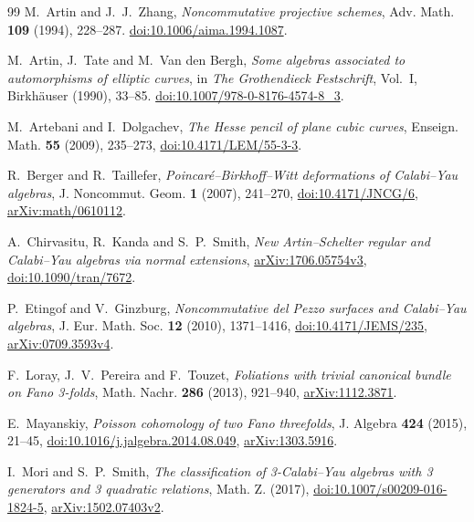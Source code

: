 \documentclass[11pt,a4paper]{ltjsarticle}
\numberwithin{equation}{section}
\begin{document}
\begin{thebibliography}{99}
M.~Artin and J.~J.~Zhang,
\textit{Noncommutative projective schemes},
Adv. Math. \textbf{109} (1994), 228--287.
\href{https://doi.org/10.1006/aima.1994.1087}{doi:10.1006/aima.1994.1087}.

M.~Artin, J.~Tate and M.~Van den Bergh,
\textit{Some algebras associated to automorphisms of elliptic curves},
in \textit{The Grothendieck Festschrift}, Vol.~I,
Birkh\"auser (1990), 33--85.
\href{https://doi.org/10.1007/978-0-8176-4574-8_3}{doi:10.1007/978-0-8176-4574-8\_3}.

M.~Artebani and I.~Dolgachev,
\textit{The Hesse pencil of plane cubic curves},
Enseign. Math. \textbf{55} (2009), 235--273,
\href{https://doi.org/10.4171/LEM/55-3-3}{doi:10.4171/LEM/55-3-3}.

R.~Berger and R.~Taillefer,
\textit{Poincar\'e--Birkhoff--Witt deformations of Calabi--Yau algebras},
J. Noncommut. Geom. \textbf{1} (2007), 241--270,
\href{https://doi.org/10.4171/JNCG/6}{doi:10.4171/JNCG/6},
\href{https://arxiv.org/abs/math/0610112}{arXiv:math/0610112}.

A.~Chirvasitu, R.~Kanda and S.~P.~Smith,
\textit{New Artin--Schelter regular and Calabi--Yau algebras via normal extensions},
\href{https://arxiv.org/abs/1706.05754}{arXiv:1706.05754v3},
\href{https://doi.org/10.1090/tran/7672}{doi:10.1090/tran/7672}.

P.~Etingof and V.~Ginzburg,
\textit{Noncommutative del Pezzo surfaces and Calabi--Yau algebras},
J. Eur. Math. Soc. \textbf{12} (2010), 1371--1416,
\href{https://doi.org/10.4171/JEMS/235}{doi:10.4171/JEMS/235},
\href{https://arxiv.org/abs/0709.3593}{arXiv:0709.3593v4}.

F.~Loray, J.~V.~Pereira and F.~Touzet,
\textit{Foliations with trivial canonical bundle on Fano 3-folds},
Math. Nachr. \textbf{286} (2013), 921--940,
\href{https://arxiv.org/abs/1112.3871}{arXiv:1112.3871}.

E.~Mayanskiy,
\textit{Poisson cohomology of two Fano threefolds},
J. Algebra \textbf{424} (2015), 21--45,
\href{https://doi.org/10.1016/j.jalgebra.2014.08.049}{doi:10.1016/j.jalgebra.2014.08.049},
\href{https://arxiv.org/abs/1303.5916}{arXiv:1303.5916}.

I.~Mori and S.~P.~Smith,
\textit{The classification of 3-Calabi--Yau algebras with 3 generators and 3 quadratic relations},
Math. Z. (2017),
\href{https://doi.org/10.1007/s00209-016-1824-5}{doi:10.1007/s00209-016-1824-5},
\href{https://arxiv.org/abs/1502.07403}{arXiv:1502.07403v2}.


\end{thebibliography}
\end{document}
